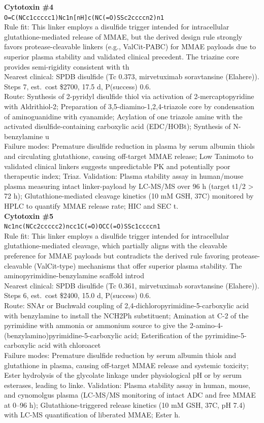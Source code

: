 \documentclass[10pt]{article}
\begin{document}
\noindent\textbf{Cytotoxin \#4} \\ \texttt{O=C(NCc1ccccc1)Nc1n[nH]c(NC(=O)SSc2ccccn2)n1} \\ Rule fit: This linker employs a disulfide trigger intended for intracellular glutathione-mediated release of MMAE, but the derived design rule strongly favors protease-cleavable linkers (e.g., ValCit-PABC) for MMAE payloads due to superior plasma stability and validated clinical precedent. The triazine core provides semi-rigidity consistent with th \\ Nearest clinical: SPDB disulfide (Tc 0.373, mirvetuximab soravtansine (Elahere)). Steps 7, est.\ cost \$2700, 17.5 d, P(success) 0.6. \\ Route: Synthesis of 2-pyridyl disulfide thiol via activation of 2-mercaptopyridine with Aldrithiol-2; Preparation of 3,5-diamino-1,2,4-triazole core by condensation of aminoguanidine with cyanamide; Acylation of one triazole amine with the activated disulfide-containing carboxylic acid (EDC/HOBt); Synthesis of N-benzylamine u \\ Failure modes: Premature disulfide reduction in plasma by serum albumin thiols and circulating glutathione, causing off-target MMAE release; Low Tanimoto to validated clinical linkers suggests unpredictable PK and potentially poor therapeutic index; Triaz. Validation: Plasma stability assay in human/mouse plasma measuring intact linker-payload by LC-MS/MS over 96 h (target t1/2 > 72 h); Glutathione-mediated cleavage kinetics (10 mM GSH, 37\textdegree{}C) monitored by HPLC to quantify MMAE release rate; HIC and SEC t. \\[0.4em]
\noindent\textbf{Cytotoxin \#5} \\ \texttt{Nc1nc(NCc2ccccc2)ncc1C(=O)OCC(=O)SSc1ccccn1} \\ Rule fit: This linker employs a disulfide trigger intended for intracellular glutathione-mediated cleavage, which partially aligns with the cleavable preference for MMAE payloads but contradicts the derived rule favoring protease-cleavable (ValCit-type) mechanisms that offer superior plasma stability. The aminopyrimidine-benzylamine scaffold introd \\ Nearest clinical: SPDB disulfide (Tc 0.361, mirvetuximab soravtansine (Elahere)). Steps 6, est.\ cost \$2400, 15.0 d, P(success) 0.6. \\ Route: SNAr or Buchwald coupling of 2,4-dichloropyrimidine-5-carboxylic acid with benzylamine to install the NCH2Ph substituent; Amination at C-2 of the pyrimidine with ammonia or ammonium source to give the 2-amino-4-(benzylamino)pyrimidine-5-carboxylic acid; Esterification of the pyrimidine-5-carboxylic acid with chloroacet \\ Failure modes: Premature disulfide reduction by serum albumin thiols and glutathione in plasma, causing off-target MMAE release and systemic toxicity; Ester hydrolysis of the glycolate linkage under physiological pH or by serum esterases, leading to linke. Validation: Plasma stability assay in human, mouse, and cynomolgus plasma (LC-MS/MS monitoring of intact ADC and free MMAE at 0--96 h); Glutathione-triggered release kinetics (10 mM GSH, 37\textdegree{}C, pH 7.4) with LC-MS quantification of liberated MMAE; Ester h. \\[0.4em]
\end{document}
